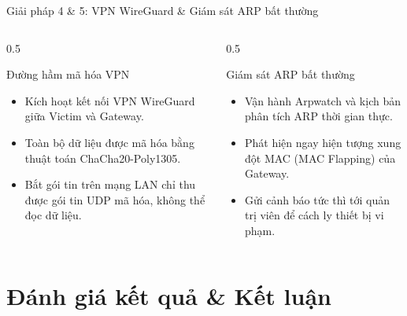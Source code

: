 \documentclass[fleqn]{beamer}
\begin{document}
\begin{frame}{Giải pháp 4 \& 5: VPN WireGuard \& Giám sát ARP bất thường}
  \begin{columns}
    \begin{column}{0.5\textwidth}
      \begin{block}{Đường hầm mã hóa VPN}
        \begin{itemize}
          \item Kích hoạt kết nối VPN WireGuard giữa Victim và Gateway.
          \item Toàn bộ dữ liệu được mã hóa bằng thuật toán ChaCha20-Poly1305.
          \item Bắt gói tin trên mạng LAN chỉ thu được gói tin UDP mã hóa, không thể đọc dữ liệu.
        \end{itemize}
      \end{block}
    \end{column}
    \begin{column}{0.5\textwidth}
      \begin{block}{Giám sát ARP bất thường}
        \begin{itemize}
          \item Vận hành Arpwatch và kịch bản phân tích ARP thời gian thực.
          \item Phát hiện ngay hiện tượng xung đột MAC (MAC Flapping) của Gateway.
          \item Gửi cảnh báo tức thì tới quản trị viên để cách ly thiết bị vi phạm.
        \end{itemize}
      \end{block}
    \end{column}
  \end{columns}
\end{frame}

\section{Đánh giá kết quả \& Kết luận}
\end{document}

